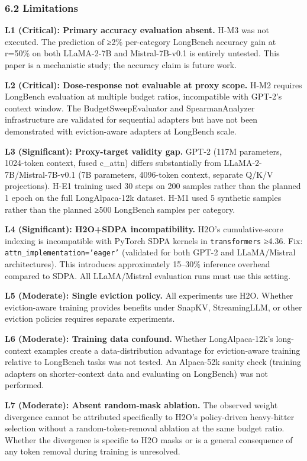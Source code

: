 \subsubsection{6.2 Limitations}

\textbf{L1 (Critical): Primary accuracy evaluation absent.} H-M3 was not executed. The prediction of ≥2\% per-category LongBench accuracy gain at r=50\% on both LLaMA-2-7B and Mistral-7B-v0.1 is entirely untested. This paper is a mechanistic study; the accuracy claim is future work.

\textbf{L2 (Critical): Dose-response not evaluable at proxy scope.} H-M2 requires LongBench evaluation at multiple budget ratios, incompatible with GPT-2's context window. The BudgetSweepEvaluator and SpearmanAnalyzer infrastructure are validated for sequential adapters but have not been demonstrated with eviction-aware adapters at LongBench scale.

\textbf{L3 (Significant): Proxy-target validity gap.} GPT-2 (117M parameters, 1024-token context, fused c_attn) differs substantially from LLaMA-2-7B/Mistral-7B-v0.1 (7B parameters, 4096-token context, separate Q/K/V projections). H-E1 training used 30 steps on 200 samples rather than the planned 1 epoch on the full LongAlpaca-12k dataset. H-M1 used 5 synthetic samples rather than the planned ≥500 LongBench samples per category.

\textbf{L4 (Significant): H2O+SDPA incompatibility.} H2O's cumulative-score indexing is incompatible with PyTorch SDPA kernels in \texttt{transformers} ≥4.36. Fix: \texttt{attn_implementation='eager'} (validated for both GPT-2 and LLaMA/Mistral architectures). This introduces approximately 15–30\% inference overhead compared to SDPA. All LLaMA/Mistral evaluation runs must use this setting.

\textbf{L5 (Moderate): Single eviction policy.} All experiments use H2O. Whether eviction-aware training provides benefits under SnapKV, StreamingLLM, or other eviction policies requires separate experiments.

\textbf{L6 (Moderate): Training data confound.} Whether LongAlpaca-12k's long-context examples create a data-distribution advantage for eviction-aware training relative to LongBench tasks was not tested. An Alpaca-52k sanity check (training adapters on shorter-context data and evaluating on LongBench) was not performed.

\textbf{L7 (Moderate): Absent random-mask ablation.} The observed weight divergence cannot be attributed specifically to H2O's policy-driven heavy-hitter selection without a random-token-removal ablation at the same budget ratio. Whether the divergence is specific to H2O masks or is a general consequence of any token removal during training is unresolved.

